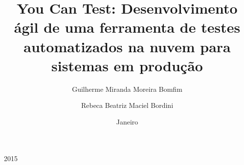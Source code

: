 \documentclass{projetofinal-dcc}
\begin{document}
\title{You Can Test: Desenvolvimento ágil de uma ferramenta de testes automatizados na nuvem para sistemas em produção}

\author{Guilherme Miranda Moreira Bomfim}{}
\author{Rebeca Beatriz Maciel Bordini}{}





\date{Janeiro}{2015}
\maketitle

\startdocument
\makethankspage

\begin{abstract}{
  
}
\end{abstract}

\begin{englishabstract}{
  
}
\end{englishabstract}

\makefigurespage

\maketablespage
\end{document}
